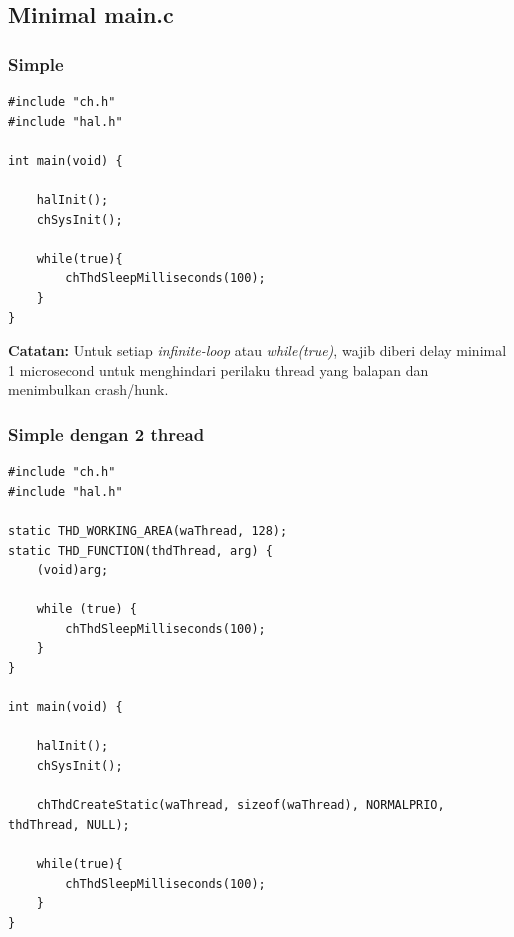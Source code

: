 \documentclass[table,dvipsnames]{beamer}
\begin{document}
	\subsection{Minimal main.c}
	\begin{frame}[fragile]
		\frametitle{Simple}
		\begin{exampleblock}{}
			\begin{verbatim}
#include "ch.h"
#include "hal.h"

int main(void) {

	halInit();
	chSysInit();

	while(true){
		chThdSleepMilliseconds(100);
	}
}
			\end{verbatim}
		\end{exampleblock}

		\begin{exampleblock}{}
			\textbf{Catatan:} Untuk setiap \textit{infinite-loop} atau \textit{while(true){}},
			wajib diberi delay minimal 1 microsecond untuk menghindari perilaku thread yang balapan dan menimbulkan crash/hunk.
		\end{exampleblock}
	\end{frame}

	\begin{frame}[fragile]
		\frametitle{Simple dengan 2 thread}
		\begin{exampleblock}{}
			\begin{verbatim}
#include "ch.h"
#include "hal.h"

static THD_WORKING_AREA(waThread, 128);
static THD_FUNCTION(thdThread, arg) {
	(void)arg;

	while (true) {
		chThdSleepMilliseconds(100);
	}
}

int main(void) {

	halInit();
	chSysInit();

	chThdCreateStatic(waThread, sizeof(waThread), NORMALPRIO, thdThread, NULL);

	while(true){
		chThdSleepMilliseconds(100);
	}
}
			\end{verbatim}
		\end{exampleblock}
	\end{frame}
\end{document}
